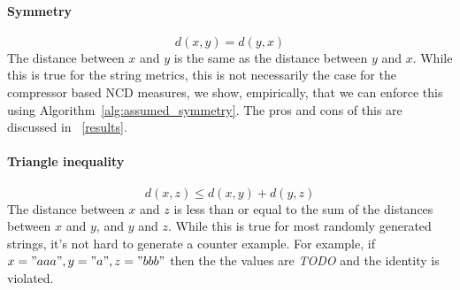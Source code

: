 \documentclass[conference]{IEEEtran}
\newcommand{\cm}[1]{\textit{{\color{blue}#1}}}
\begin{document}


\paragraph{Symmetry} 
\[
d(x, y) = d(y, x)
\]
The distance between \( x \) and \( y \) is the same as the distance between \( y \) and \( x \). While this is true for the string metrics, this is not necessarily the case for the compressor based NCD measures, we show, empirically, that we can enforce this using Algorithm~\ref{alg:assumed_symmetry}. The pros and cons of this are discussed in ~\ref{results}.

\paragraph{Triangle inequality} 
\[
d(x, z) \leq d(x, y) + d(y, z)
\]
The distance between \( x \) and \( z \) is less than or equal to the sum of the distances between \( x \) and \( y \), and \( y \) and \( z \). While this is true for most randomly generated strings, it's not hard to generate a counter example. For example, if $x = "aaa", y = "a", z = "bbb"$ then the the values are \cm{TODO} and the identity is violated.



\end{document}
